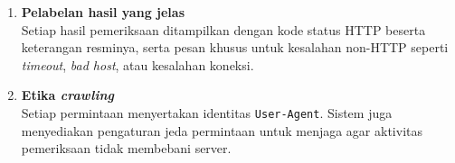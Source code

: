 \begin{enumerate}
    \item \textbf{Pelabelan hasil yang jelas}\\
    Setiap hasil pemeriksaan ditampilkan dengan kode status HTTP beserta keterangan resminya, serta pesan khusus untuk kesalahan non-HTTP seperti \textit{timeout}, \textit{bad host}, atau kesalahan koneksi.

    \item \textbf{Etika \textit{crawling}}\\
    Setiap permintaan menyertakan identitas \texttt{User-Agent}. Sistem juga menyediakan pengaturan jeda permintaan untuk menjaga agar aktivitas pemeriksaan tidak membebani server.

\end{enumerate}


